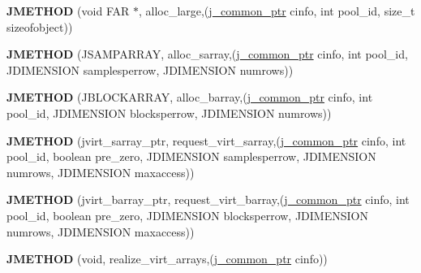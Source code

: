 \begin{DoxyCompactItemize}
\item 
\mbox{\label{structjpeg__memory__mgr_a130f6dbc700cc045bdbe35beff2cb326}} 
{\bfseries J\+M\+E\+T\+H\+OD} (void F\+AR $\ast$, alloc\+\_\+large,(\hyperlink{structjpeg__common__struct}{j\+\_\+common\+\_\+ptr} cinfo, int pool\+\_\+id, size\+\_\+t sizeofobject))
\item 
\mbox{\label{structjpeg__memory__mgr_a3fdd2e1dfdc089fd61f17b608c0263f2}} 
{\bfseries J\+M\+E\+T\+H\+OD} (J\+S\+A\+M\+P\+A\+R\+R\+AY, alloc\+\_\+sarray,(\hyperlink{structjpeg__common__struct}{j\+\_\+common\+\_\+ptr} cinfo, int pool\+\_\+id, J\+D\+I\+M\+E\+N\+S\+I\+ON samplesperrow, J\+D\+I\+M\+E\+N\+S\+I\+ON numrows))
\item 
\mbox{\label{structjpeg__memory__mgr_aefc8abe884dab5648c1e4e7ada2e2e18}} 
{\bfseries J\+M\+E\+T\+H\+OD} (J\+B\+L\+O\+C\+K\+A\+R\+R\+AY, alloc\+\_\+barray,(\hyperlink{structjpeg__common__struct}{j\+\_\+common\+\_\+ptr} cinfo, int pool\+\_\+id, J\+D\+I\+M\+E\+N\+S\+I\+ON blocksperrow, J\+D\+I\+M\+E\+N\+S\+I\+ON numrows))
\item 
\mbox{\label{structjpeg__memory__mgr_a34b830d9d7b2f4fd043e98421a700503}} 
{\bfseries J\+M\+E\+T\+H\+OD} (jvirt\+\_\+sarray\+\_\+ptr, request\+\_\+virt\+\_\+sarray,(\hyperlink{structjpeg__common__struct}{j\+\_\+common\+\_\+ptr} cinfo, int pool\+\_\+id, boolean pre\+\_\+zero, J\+D\+I\+M\+E\+N\+S\+I\+ON samplesperrow, J\+D\+I\+M\+E\+N\+S\+I\+ON numrows, J\+D\+I\+M\+E\+N\+S\+I\+ON maxaccess))
\item 
\mbox{\label{structjpeg__memory__mgr_aee93326ad6a64714443e90044614d2a6}} 
{\bfseries J\+M\+E\+T\+H\+OD} (jvirt\+\_\+barray\+\_\+ptr, request\+\_\+virt\+\_\+barray,(\hyperlink{structjpeg__common__struct}{j\+\_\+common\+\_\+ptr} cinfo, int pool\+\_\+id, boolean pre\+\_\+zero, J\+D\+I\+M\+E\+N\+S\+I\+ON blocksperrow, J\+D\+I\+M\+E\+N\+S\+I\+ON numrows, J\+D\+I\+M\+E\+N\+S\+I\+ON maxaccess))
\item 
\mbox{\label{structjpeg__memory__mgr_a35cc0c3b3ecbc7209cdc23b2255932d8}} 
{\bfseries J\+M\+E\+T\+H\+OD} (void, realize\+\_\+virt\+\_\+arrays,(\hyperlink{structjpeg__common__struct}{j\+\_\+common\+\_\+ptr} cinfo))

\end{DoxyCompactItemize}
